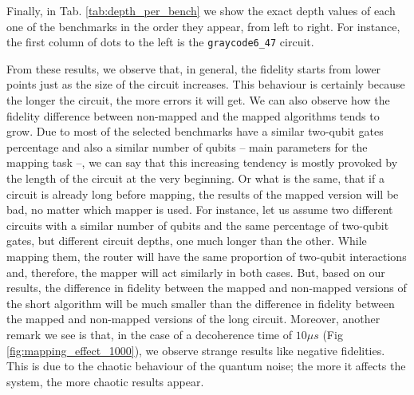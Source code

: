 Finally, in Tab. \ref{tab:depth_per_bench} we show the exact depth values of each one of the benchmarks in the order they appear, from left to right.
For instance, the first column of dots to the left is the \texttt{graycode6\_47} circuit.



From these results, we observe that, in general, the fidelity starts from lower points just as the size of the circuit increases.
This behaviour is certainly because the longer the circuit, the more errors it will get.
We can also observe how the fidelity difference between non-mapped and the mapped algorithms tends to grow.
Due to most of the selected benchmarks have a similar two-qubit gates percentage and also a similar number of qubits -- main parameters for the mapping task --, we can say that this increasing tendency is mostly provoked by the length of the circuit at the very beginning.
Or what is the same, that if a circuit is already long before mapping, the results of the mapped version will be bad, no matter which mapper is used.
For instance, let us assume two different circuits with a similar number of qubits and the same percentage of two-qubit gates, but different circuit depths, one much longer than the other.
While mapping them, the router will have the same proportion of two-qubit interactions and, therefore, the mapper will act similarly in both cases.
But, based on our results, the difference in fidelity between the mapped and non-mapped versions of the short algorithm will be much smaller than the difference in fidelity between the mapped and non-mapped versions of the long circuit.
Moreover, another remark we see is that, in the case of a decoherence time of \(10 \mu s\) (Fig \ref{fig:mapping_effect_1000}), we observe strange results like negative fidelities. 
This is due to the chaotic behaviour of the quantum noise; the more it affects the system, the more chaotic results appear.


